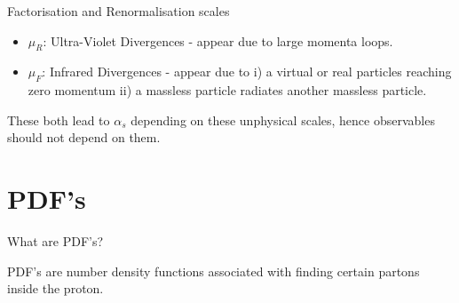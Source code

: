 \documentclass[14pt]{beamer}
\begin{document}
\begin{frame}[fragile]{Factorisation and Renormalisation scales}
	\begin{itemize}
		\item ${\mu_R}$: Ultra-Violet Divergences - appear due to large momenta loops. %
		\item ${\mu_F}$: Infrared Divergences - appear due to i) a virtual or real particles reaching zero momentum ii) a massless particle radiates another massless particle. %
		
	\end{itemize}
	
	These both lead to ${\alpha_s}$ depending on these unphysical scales, hence observables should not depend on them. %
	
\end{frame}

\section{PDF's}


\begin{frame}[fragile]{What are PDF's?}
	
	PDF's are number density functions associated with finding certain partons inside the proton. 
	
\end{frame}
\end{document}
